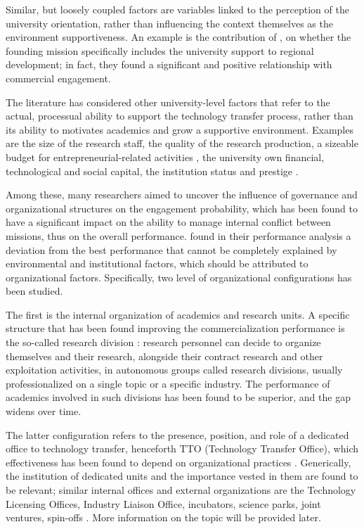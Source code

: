 Similar, but loosely coupled factors are variables linked to the perception of the university orientation, rather than influencing the context themselves as the environment supportiveness. An example is the contribution of \citet{DEste2007}, on whether the founding mission specifically includes the university support to regional development; in fact, they found a significant and positive relationship with commercial engagement.

The literature has considered other university-level factors that refer to the actual, processual ability to support the technology transfer process, rather than its ability to motivates academics and grow a supportive environment. Examples are the size of the research staff, the quality of the research production, a sizeable budget for entrepreneurial-related activities \citep{Colombo2010}, the university own financial, technological and social capital, the institution status and prestige \citep{Guerrero2014}.

Among these, many researchers aimed to uncover the influence of governance and organizational structures on the engagement probability, which has been found to have a significant impact on the ability to manage internal conflict between missions, thus on the overall performance. \citet{Siegel2003a} found in their performance analysis a deviation from the best performance that cannot be completely explained by environmental and institutional factors, which should be attributed to organizational factors. Specifically, two level of organizational configurations has been studied.

The first is the internal organization of academics and research units. A specific structure that has been found improving the commercialization performance is the so-called research division \citep{VanLooy2004}: research personnel can decide to organize themselves and their research, alongside their contract research and other exploitation activities, in autonomous groups called research divisions, usually professionalized on a single topic or a specific industry. The performance of academics involved in such divisions has been found to be superior, and the gap widens over time.

The latter configuration refers to the presence, position, and role of a dedicated office to technology transfer, henceforth TTO (Technology Transfer Office), which effectiveness has been found to depend on organizational practices \citep{Siegel2003a}. Generically, the institution of dedicated units and the importance vested in them are found to be relevant; similar internal offices and external organizations are the Technology Licensing Offices, Industry Liaison Office, incubators, science parks, joint ventures, spin-offs \citep{Tijssen2006}. More information on the topic will be provided later.

